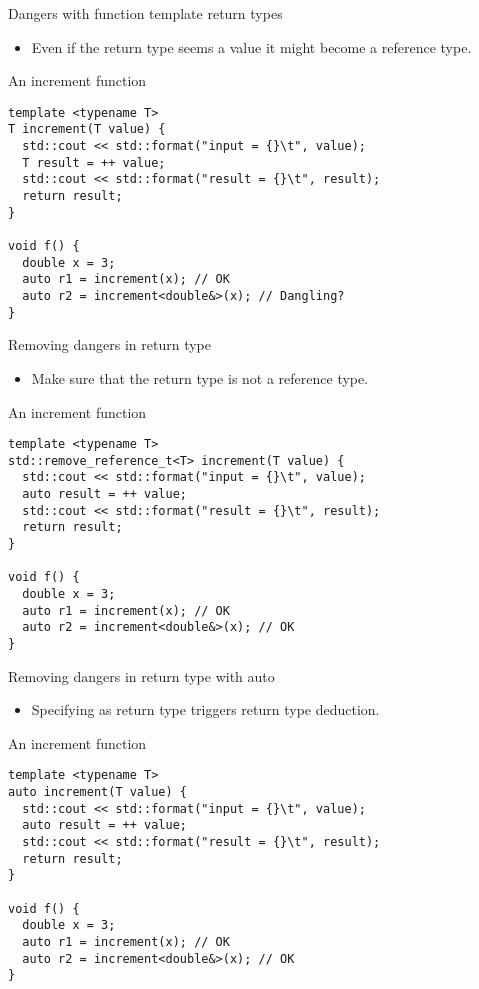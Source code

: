 \begin{frame}[t,fragile]{Dangers with function template return types}
\begin{itemize}
  \item Even if the return type seems a value it might become a reference type.
\end{itemize}

\begin{block}{An increment function}
\begin{lstlisting}
template <typename T>
T increment(T value) {
  std::cout << std::format("input = {}\t", value);
  T result = ++ value;
  std::cout << std::format("result = {}\t", result);
  return result;
}

void f() {
  double x = 3;
  auto r1 = increment(x); // OK
  auto r2 = increment<double&>(x); // Dangling?
}
\end{lstlisting}
\end{block}
\end{frame}

\begin{frame}[t,fragile]{Removing dangers in return type}
\begin{itemize}
  \item Make sure that the return type is not a reference type.
\end{itemize}
\begin{block}{An increment function}
\begin{lstlisting}
template <typename T>
std::remove_reference_t<T> increment(T value) {
  std::cout << std::format("input = {}\t", value);
  auto result = ++ value;
  std::cout << std::format("result = {}\t", result);
  return result;
}

void f() {
  double x = 3;
  auto r1 = increment(x); // OK
  auto r2 = increment<double&>(x); // OK
}
\end{lstlisting}
\end{block}
\end{frame}

\begin{frame}[t,fragile]{Removing dangers in return type with auto}
\begin{itemize}
  \item Specifying  as return type triggers return type deduction.
\end{itemize}
\begin{block}{An increment function}
\begin{lstlisting}
template <typename T>
auto increment(T value) {
  std::cout << std::format("input = {}\t", value);
  auto result = ++ value;
  std::cout << std::format("result = {}\t", result);
  return result;
}

void f() {
  double x = 3;
  auto r1 = increment(x); // OK
  auto r2 = increment<double&>(x); // OK
}
\end{lstlisting}
\end{block}
\end{frame}
